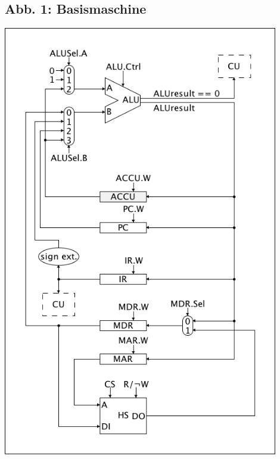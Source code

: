 \documentclass[12pt,titlepage]{article}
\begin{document}
\subsection{Abb. 1: Basismaschine}
\includegraphics[width=12cm]{schematics.png}
\end{document}
